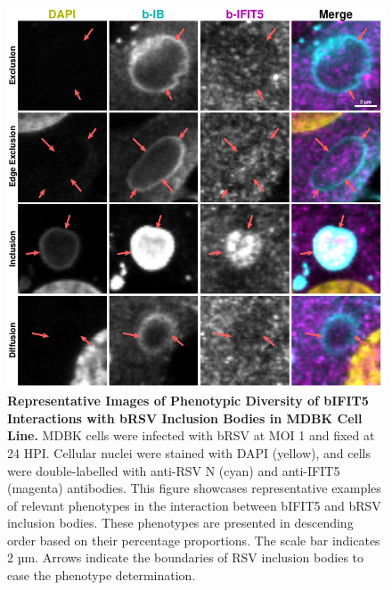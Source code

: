 \begin{figure}
    \centering
    \includegraphics[width=1\linewidth]{08. Chapter 3/Figs/02. Infection/04. IFIT5/09. mdbk i5.pdf}
    \caption[Representative Images of Phenotypic Diversity of bIFIT5 Interactions with bRSV Inclusion Bodies in MDBK Cell Line.]{\textbf{Representative Images of Phenotypic Diversity of bIFIT5 Interactions with bRSV Inclusion Bodies in MDBK Cell Line.} MDBK cells were infected with bRSV at MOI 1 and fixed at 24 HPI. Cellular nuclei were stained with DAPI (yellow), and cells were double-labelled with anti-RSV N (cyan) and anti-IFIT5 (magenta) antibodies. This figure showcases representative examples of relevant phenotypes in the interaction between bIFIT5 and bRSV inclusion bodies. These phenotypes are presented in descending order based on their percentage proportions. The scale bar indicates 2 µm.  Arrows indicate the boundaries of RSV inclusion bodies to ease the phenotype determination.}
    \label{fig:Representative Images of Phenotypic Diversity of bIFIT5 Interactions with bRSV Inclusion Bodies in MDBK Cell Line}
\end{figure}
